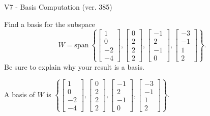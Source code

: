 \begin{exercise}
  \begin{exerciseTitle}V7 - Basis Computation (ver. 385)\end{exerciseTitle}
  \begin{exerciseStatement}
    Find a basis for the subspace 
\[W=\mathrm{span}\ \left\{\left[\begin{array}{r}
1 \\
0 \\
-2 \\
-4
\end{array}\right] , \left[\begin{array}{r}
0 \\
2 \\
2 \\
2
\end{array}\right] , \left[\begin{array}{r}
-1 \\
2 \\
-1 \\
0
\end{array}\right] , \left[\begin{array}{r}
-3 \\
-1 \\
1 \\
2
\end{array}\right]\right\}.\]
 Be sure to explain why your result is a basis.


  \end{exerciseStatement}
  \begin{exerciseAnswer}
   A basis of \(W\) is  \(\left\{\left[\begin{array}{r}
1 \\
0 \\
-2 \\
-4
\end{array}\right] , \left[\begin{array}{r}
0 \\
2 \\
2 \\
2
\end{array}\right] , \left[\begin{array}{r}
-1 \\
2 \\
-1 \\
0
\end{array}\right] , \left[\begin{array}{r}
-3 \\
-1 \\
1 \\
2
\end{array}\right]\right\}\).
  


  \end{exerciseAnswer}
\end{exercise}